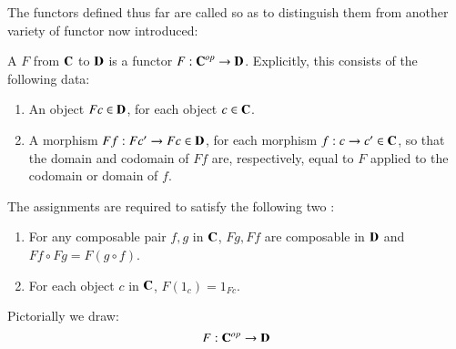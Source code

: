\documentclass[12pt]{report}
\begin{document}
The functors defined thus far are called  so as to distinguish them from another variety of functor now introduced: 

\begin{defn}{}{}
    A  $F$ from $\normalfont\textbf{C}$ to $\normalfont\textbf{D}$ is a functor $F:\normalfont\textbf{C}^{op}\rightarrow \normalfont\textbf{D}$. Explicitly, this consists of the following data: \begin{enumerate}
        \item An object $Fc \in \normalfont\textbf{D}$, for each object $c \in \normalfont\textbf{C}$.
        \item A morphism $Ff:Fc'\rightarrow Fc\in \normalfont\textbf{D}$, for each morphism $f:c\rightarrow c' \in \normalfont\textbf{C}$, so that the domain and codomain of $Ff$ are, respectively, equal to $F$ applied to the codomain or domain of $f$.
    \end{enumerate}
    The assignments are required to satisfy the following two : \begin{enumerate}
        \item For any composable pair $f,g$ in $\normalfont\textbf{C}$, $Fg,Ff$ are composable in $\normalfont\textbf{D}$ and $Ff\circ Fg = F(g\circ f)$.
        \item For each object $c$ in $\normalfont\textbf{C}$, $F(1_c) = 1_{Fc}$.
    \end{enumerate}
    Pictorially we draw:
    \begin{equation*}
        F:\normalfont\textbf{C}^{op}\rightarrow \normalfont\textbf{D}
    \end{equation*}
    \begin{center}
    \end{center}
\end{defn}
\end{document}
